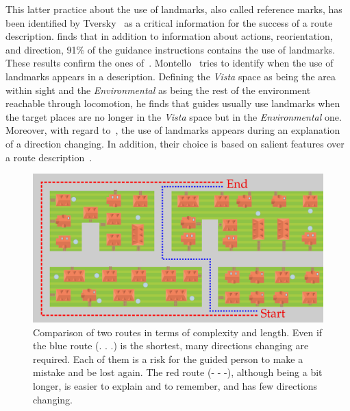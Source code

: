 This latter practice about the use of landmarks, also called reference marks, has been identified by Tversky~\cite{tversky_1999_pictorial} as a critical information for the success of a route description. \cite{tversky_1998_space} finds that in addition to information about actions, reorientation, and direction, 91\% of the guidance instructions contains the use of landmarks. These results confirm the ones of~\cite{denis_1997_description}. Montello~\cite{montello_1993_scale} tries to identify when the use of landmarks appears in a description. Defining the \textit{Vista} space as being the area within sight and the \textit{Environmental} as being the rest of the environment reachable through locomotion, he finds that guides usually use landmarks when the target places are no longer in the \textit{Vista} space but in the \textit{Environmental} one. Moreover, with regard to~\cite{tversky_1999_pictorial}, the use of landmarks appears during an explanation of a direction changing. In addition, their choice is based on salient features over a route description~\cite{nothegger_2004_selection}.

\begin{figure}[ht!]
\centering
\includegraphics[scale=0.22]{figures/chapter3/landscape/landscape.png}
\caption{\label{fig:chap3_shortest} Comparison of two routes in terms of complexity and length. Even if the blue route (. . .) is the shortest, many directions changing are required. Each of them is a risk for the guided person to make a mistake and be lost again. The red route (- - -), although being a bit longer, is easier to explain and to remember, and has few directions changing.}
\end{figure}

